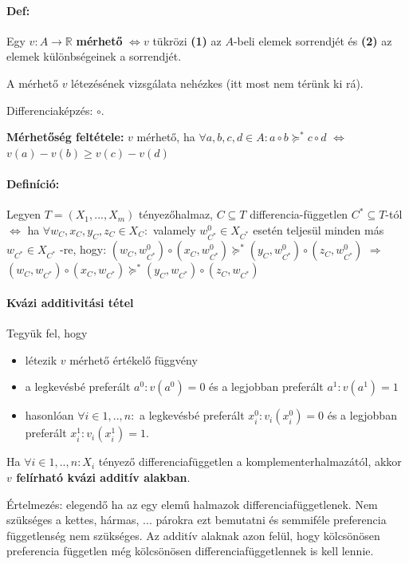 \documentclass[a4paper,12pt]{article}
\begin{document}
\paragraph{Def:} Egy $v: A \rightarrow \mathbb{R}$ \textbf{mérhető} $\Leftrightarrow v$ tükrözi \textbf{(1)} az $A$-beli elemek sorrendjét és \textbf{(2)} az elemek különbségeinek a sorrendjét. 

A mérhető $v$ létezésének vizsgálata nehézkes (itt most nem térünk ki rá).

Differenciaképzés: $\circ$.

\textbf{Mérhetőség feltétele:} $v$ mérhető, ha $\forall a,b,c,d \in A: a \circ b \succeq^* c \circ d$ $\Leftrightarrow$ $v(a)-v(b) \geq v(c)-v(d)$ 
 
 
\paragraph{Definíció: } Legyen $T=(X_1,...,X_m)$ tényezőhalmaz, $C \subseteq T$ differencia-független $C^*\subseteq T $-tól $\Leftrightarrow$ ha $\forall w_C,x_C,y_C,z_C \in X_C:$ valamely $w_{C^*}^0 \in X_{C^*}$ esetén teljesül minden más $w_{C^*} \in X_{C^*}$ -re, hogy: $(w_C, w_{C^*}^0) \circ (x_C, w_{C^*}^0) \succeq^* (y_C, w_{C^*}^0) \circ (z_C, w_{C^*}^0)$  $\Rightarrow$ $(w_C, w_{C^*}) \circ (x_C, w_{C^*}) \succeq^* (y_C, w_{C^*}) \circ (z_C, w_{C^*})$ 

\paragraph{Kvázi additivitási tétel} Tegyük fel, hogy
\begin{itemize}
\item létezik $v$ mérhető értékelő függvény
\item a legkevésbé preferált $a^0: v(a^0) = 0$ és a legjobban preferált $a^1: v(a^1)=1$
\item hasonlóan $\forall i \in 1,..,n : $ a legkevésbé preferált $x_i^0: v_i(x_i^0) = 0$ és a legjobban preferált $x_i^1: v_i(x_i^1)=1$.
\end{itemize}
Ha $\forall i \in 1,..,n : X_i$ tényező differenciafüggetlen a komplementerhalmazától, akkor \textbf{$v$ felírható kvázi additív alakban}. 

Értelmezés: elegendő ha az egy elemű halmazok differenciafüggetlenek. 
Nem szükséges a kettes, hármas, ... párokra ezt bemutatni és semmiféle preferencia függetlenség nem szükséges.
Az additív alaknak azon felül, hogy kölcsönösen preferencia független még kölcsönösen differenciafüggetlennek is kell lennie.
\end{document}
